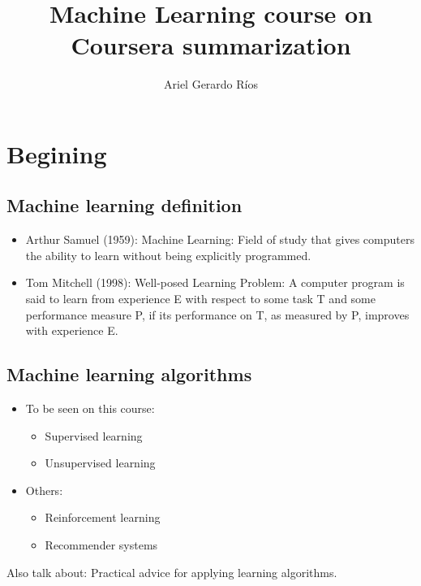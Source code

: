 \documentclass[a4paper]{report}
\begin{document}
  \title{Machine Learning course on Coursera summarization}
  \author{Ariel Gerardo Ríos}
  \date{}
  \maketitle

  \tableofcontents

  \chapter{Begining}
    \section{Machine learning definition}
      \begin{itemize}
        \item Arthur Samuel (1959): Machine Learning: Field of study that gives
              computers the ability to learn without being explicitly
              programmed.
        \item Tom Mitchell (1998): Well-posed Learning Problem: A computer
              program is said to learn from experience E with respect to some
              task T and some performance measure P, if its performance on T,
              as measured by P, improves with experience E.
      \end{itemize}

    \section{Machine learning algorithms}
      \begin{itemize}
        \item To be seen on this course:
              \begin{itemize}
                \item Supervised learning
                \item Unsupervised learning
              \end{itemize}
        \item Others:
              \begin{itemize}
                \item Reinforcement learning
                \item Recommender systems
              \end{itemize}
      \end{itemize}
      Also talk about: Practical advice for applying learning algorithms.
\end{document}
